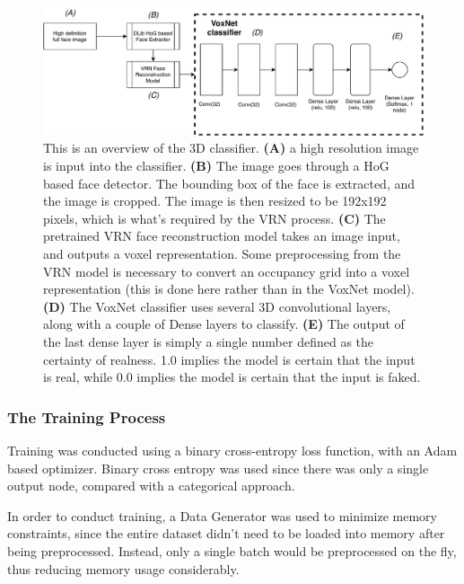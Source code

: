 \documentclass[10pt,a4paper]{article}
\begin{document}
            \begin{figure}
                \centering
                \includegraphics[width=\linewidth]{voxnet.pdf}
                \caption{
                    This is an overview of the 3D classifier. \textbf{(A)} a high resolution image is input into the classifier. \textbf{(B)} The image goes through a HoG based face detector. The bounding box of the face is extracted, and the image is cropped. 
                    The image is then resized to be 192x192 pixels, which is what's required by the VRN process.
                    \textbf{(C)} The pretrained VRN face reconstruction model takes an image input, and outputs a voxel representation. Some preprocessing from the VRN model 
                    is necessary to convert an occupancy grid into a voxel representation (this is done here rather than in the VoxNet model).
                    \textbf{(D)} The VoxNet classifier uses several 3D convolutional layers, along with a couple of Dense layers to classify.
                    \textbf{(E)} The output of the last dense layer is simply a single number defined as the certainty of realness. 1.0 implies the model is certain that the input is real, while 0.0 implies the model is certain that the input is faked.
                }
                \label{3DClassifierArchitectureDiagram}
            \end{figure}

        \subsubsection{The Training Process}
            Training was conducted using a binary cross-entropy loss function, with an Adam based optimizer. Binary cross entropy was used since there was only a single output node,
            compared with a categorical approach. 

            In order to conduct training, a Data Generator was used to minimize memory constraints, since the entire dataset didn't need to be loaded into memory after being preprocessed. Instead,
            only a single batch would be preprocessed on the fly, thus reducing memory usage considerably.
\end{document}
